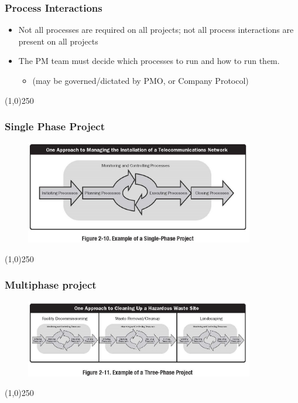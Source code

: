 \begin{frame}
\frametitle{Process Interactions}
\begin{itemize}
	\item Not all processes are required on all projects; not all process interactions are present on all projects\\
	\item The PM team must decide which processes to run and how to run them. 
		\begin{itemize}
			\item (may be governed/dictated by PMO, or Company Protocol) 
		\end{itemize}
\end{itemize}
\end{frame}
\begin{center}\line(1,0){250}\end{center}



\begin{frame}
\frametitle{Single Phase Project}
 \begin{figure}
 	\centering
 		\includegraphics[width = 10cm]{images/Fig2-10.jpg}
 	\label{fig:2-10}
 \end{figure}
\end{frame}
\begin{center}\line(1,0){250}\end{center}



\begin{frame}
\frametitle{Multiphase project}
 \begin{figure}
 	\centering
 		\includegraphics[width = 10cm]{images/Fig2-11.jpg}
 	\label{fig:2-11}
 \end{figure}
\end{frame}
\begin{center}\line(1,0){250}\end{center}



